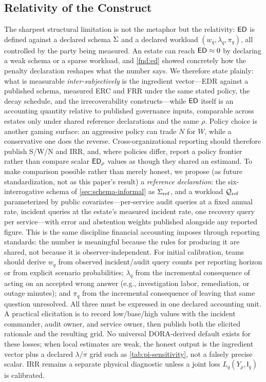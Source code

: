 \subsection{Relativity of the Construct}
\label{sec:disc-relativity}
The sharpest structural limitation is not the metaphor but the relativity:
$\mathsf{ED}$ is defined against a declared schema $\Sigma$ and a declared workload
$(w_q, \lambda_q, \pi_q)$, all controlled by the party being measured. An estate can reach
$\mathsf{ED} \approx 0$ by declaring a weak schema or a sparse workload, and
\cref{fnd:ed} showed concretely how the penalty declaration reshapes what the
number says. We therefore state plainly: what is measurable
\emph{inter-subjectively} is the ingredient vector---EDR against a published
schema, measured ERC and FRR under the same stated policy, the decay schedule, and the
irrecoverability constructs---while $\mathsf{ED}$ itself is an accounting quantity
relative to published governance inputs, comparable across estates only under
shared reference declarations and the same $\rho$. Policy choice is another gaming
surface: an aggressive policy can trade $N$ for $W$, while a conservative one does
the reverse. Cross-organizational reporting should therefore publish S/W/N and IRR,
and, where policies differ, report a policy frontier rather than compare scalar
$\mathsf{ED}_\rho$ values as though they shared an estimand. To make comparison possible rather than merely
honest, we propose (as future standardization, not as this paper's result) a
\emph{reference declaration}: the six-interrogative schema of
\cref{sec:schema-informal} as $\Sigma_{\mathrm{ref}}$, and a workload
$\mathcal{Q}_{\mathrm{ref}}$ parameterized by public covariates---per-service audit
queries at a fixed annual rate, incident queries at the estate's measured
incident rate, one recovery query per service---with error and abstention weights published
alongside any reported figure. This is the same discipline financial accounting
imposes through reporting standards: the number is meaningful because the rules
for producing it are shared, not because it is observer-independent.
For initial calibration, teams should derive $w_q$ from observed incident/audit
query counts per reporting horizon or from explicit scenario probabilities;
$\lambda_q$ from the incremental consequence of acting on an accepted wrong answer
(e.g., investigation labor, remediation, or outage minutes); and $\pi_q$ from the
incremental consequence of leaving that same question unresolved. All three must be
expressed in one declared accounting unit. A practical elicitation is to record
low/base/high values with the incident commander, audit owner, and service owner,
then publish both the elicited rationale and the resulting grid. No universal
DORA-derived default exists for these losses; when local estimates are weak, the
honest output is the ingredient vector plus a declared $\lambda/\pi$ grid such as
\cref{tab:pi-sensitivity}, not a falsely precise scalar. IRR remains a separate
physical diagnostic unless a joint loss $L_q(Y_\rho,\mathsf I_q)$ is calibrated.

